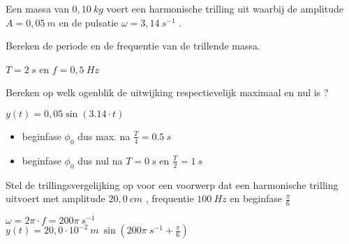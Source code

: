 \documentclass{ximera}
\begin{document}
\begin{exercise} 
Een massa van $0,10 \ kg$ voert een harmonische trilling uit waarbij de amplitude $A = 0,05 \  m$ en de pulsatie  $\omega = 3,14 \ s^{-1}$ . 
    \begin{question}
        Bereken de periode en de frequentie van de trillende massa.
            \begin{oplossing}
                $T=2 \ s$ en $f=0,5 \ Hz$
            \end{oplossing}
    \end{question}

    \begin{question}
        Bereken op welk ogenblik de uitwijking respectievelijk  maximaal en nul is ?
            \begin{oplossing}
                $y(t)=0,05 \sin (3.14\cdot t)$
                \begin{itemize}
                    \item beginfase $\phi_0$ dus max. na $\frac{T}{4}=0.5 \ s$
                    \item beginfase $\phi_0$ dus nul na  $T=0 \ s$ en $\frac{T}{2}=1 \ s$
                \end{itemize}
            \end{oplossing}
    \end{question}
\end{exercise}

\begin{exercise} 
Stel de trillingsvergelijking op voor een voorwerp dat een harmonische trilling uitvoert met amplitude $20,0 \ cm$ , frequentie $100 \ Hz$ en beginfase $\frac{\pi}{6}$
    \begin{oplossing}
        $\omega=2\pi \cdot f=200\pi \ s^{-1}$ \\
        $y(t)=20,0\cdot 10^{-2} \ m \ \sin\left(200\pi \ s^{-1}+\frac{\pi}{6}\right)$
    \end{oplossing}
\end{exercise}
\end{document}
